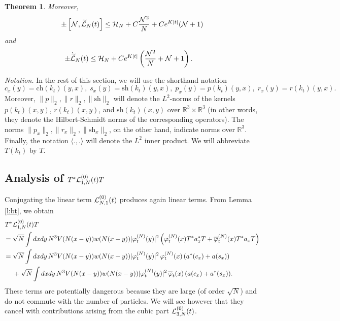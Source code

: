 \documentclass[11pt,a4paper]{article}
\newtheorem{thm}{Theorem}[section]  %
\newcommand{\ech}[2]{#2}	%
\newcommand{\ekt}{e^{K\lvert t\rvert}}	%
\newcommand{\bR}{{\mathbb R}}
\newcommand{\wt}{\widetilde}
\newcommand{\cH}{{\cal H}}
\newcommand{\cL}{{\cal L}}
\newcommand{\cN}{{\cal N}}
\newcommand{\Ncal}{\mathcal{N}}		%
\begin{document}
\begin{thm}
Moreover, 
\begin{equation}\label{eq:thmL-2} \pm \left[ \cN , \wt{\cL}_N (t) \right]  \leq \cH_N + C \frac{\cN^2}{N} + C \ech{\| \varphi_t^{(N)} \|_{H^2}^2}{\ekt} (\cN+1) \end{equation}
and 
\begin{equation}\label{eq:thmL-3}
\begin{split} 
\pm \dot{\wt{\cL}}_N (t)  \leq \; &\cH_N + \ech{C \| \varphi_t^{(N)} \|_{H^4}^2 \, \frac{\cN^2}{N}  \\ &+ C \left( \| \varphi_t^{(N)} \|_{H^4}  \| \varphi_t^{(N)} \|_{H^2} + \| \varphi_t^{(N)} \|_{H^2}^3 \right) \left(\cN+1 \right)}{C \ekt \left(\frac{\Ncal^2}{N} + \Ncal + 1 \right)}.  
\end{split}
\end{equation}
\end{thm}

\bigskip

{\it Notation.} In the rest of this section, we will use the shorthand notation \begin{equation}\label{eq:def-csprx} 
c_x (y) = \text{ch} (k_t) (y,x), \;  s_x (y) = \text{sh} (k_t) (y,x), \; p_x (y) = p (k_t) (y,x), \; 
r_x (y) = r (k_t) (y,x). \end{equation}
Moreover, $\| p \|_2 , \| r \|_2, \|\text{sh} \|_2$ will denote the $L^2$-norms of the kernels $p (k_t) (x,y)$, $r (k_t) (x,y)$, and $\text{sh} (k_t) (x,y)$ over $\bR^3 \times \bR^3$ (in other words, they denote the Hilbert-Schmidt norms of the corresponding operators). The norms $\| p_x \|_2, \| r_x \|_2, \| \text{sh}_x \|_2$, on the other hand, indicate norms over $\bR^3$. Finally, the notation $\langle . , . \rangle$ will denote the $L^2$ inner product. We will abbreviate $T(k_t)$ by $T$.


\subsection{Analysis of $T^* \cL^{(0)}_{1,N} (t) T$}

Conjugating the linear term $\cL^{(0)}_{N,1} (t)$ produces again linear terms. {F}rom Lemma \ref{l:bt}, we obtain
\begin{equation}\label{eq:TL1T} \begin{split} T^* & \cL^{(0)}_{1,N} (t) T \\ = \; & \sqrt{N} \int dx dy \, N^3 V (N (x-y)) w (N (x-y)) |\varphi_t^{(N)} (y)|^2 \left( \varphi^{(N)}_t (x) T^* a^*_x T + \overline{\varphi}_t^{(N)} (x) T^* a_x T \right) \\ 
= \; &\sqrt{N} \int dx dy \, N^3 V (N (x-y)) w (N (x-y)) |\varphi_t^{(N)} (y)|^2 \, \varphi^{(N)}_t (x)  \, ( a^*(c_x) + a(s_x)) \\ &+ \sqrt{N} \int dx dy \, N^3 V (N (x-y)) w (N (x-y)) |\varphi_t^{(N)} (y)|^2 \, \overline{\varphi}_t (x)  \, ( a (c_x) + a^* (s_x)). \end{split} \end{equation}
These terms are potentially dangerous because they are large (of order $\sqrt{N}$) and do not commute with the number of particles. We will see however that they cancel with contributions arising from the cubic part $\cL_{3,N}^{(0)} (t)$. 
\end{document}

